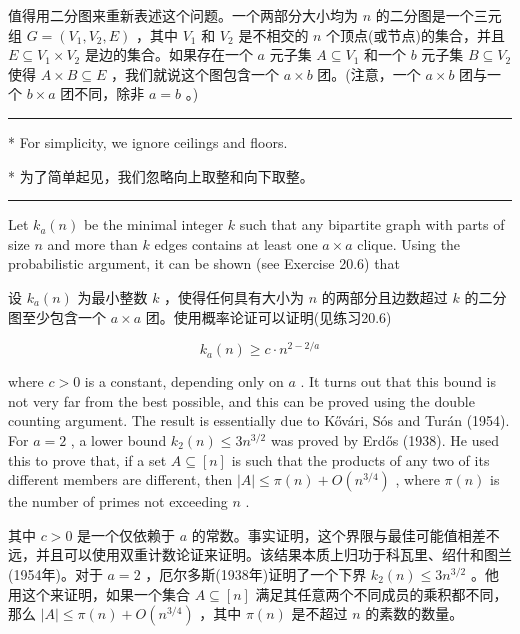 \documentclass[10pt]{article}
\newcommand{\HRule}{\begin{center}\rule{0.9\linewidth}{0.2mm}\end{center}}
\begin{document}
\begin{tcolorbox}\relax
值得用二分图来重新表述这个问题。一个两部分大小均为 \(n\) 的二分图是一个三元组 \(G = \left( {{V}_{1},{V}_{2},E}\right)\) ，其中 \({V}_{1}\) 和 \({V}_{2}\) 是不相交的 \(n\) 个顶点(或节点)的集合，并且 \(E \subseteq  {V}_{1} \times  {V}_{2}\) 是边的集合。如果存在一个 \(a\) 元子集 \(A \subseteq  {V}_{1}\) 和一个 \(b\) 元子集 \(B \subseteq  {V}_{2}\) 使得 \(A \times  B \subseteq  E\) ，我们就说这个图包含一个 \(a \times  b\) 团。(注意，一个 \(a \times  b\) 团与一个 \(b \times  a\) 团不同，除非 \(a = b\) 。)
\end{tcolorbox}

\HRule

* For simplicity, we ignore ceilings and floors.

\begin{tcolorbox}\relax
* 为了简单起见，我们忽略向上取整和向下取整。
\end{tcolorbox}

\HRule

Let \({k}_{a}\left( n\right)\) be the minimal integer \(k\) such that any bipartite graph with parts of size \(n\) and more than \(k\) edges contains at least one \(a \times  a\) clique. Using the probabilistic argument, it can be shown (see Exercise 20.6) that

\begin{tcolorbox}\relax
设 \({k}_{a}\left( n\right)\) 为最小整数 \(k\) ，使得任何具有大小为 \(n\) 的两部分且边数超过 \(k\) 的二分图至少包含一个 \(a \times  a\) 团。使用概率论证可以证明(见练习20.6)
\end{tcolorbox}

\[
{k}_{a}\left( n\right)  \geq  c \cdot  {n}^{2 - 2/a}
\]

where \(c > 0\) is a constant, depending only on \(a\) . It turns out that this bound is not very far from the best possible, and this can be proved using the double counting argument. The result is essentially due to Kővári, Sós and Turán (1954). For \(a = 2\) , a lower bound \({k}_{2}\left( n\right)  \leq  3{n}^{3/2}\) was proved by Erdős (1938). He used this to prove that, if a set \(A \subseteq  \left\lbrack  n\right\rbrack\) is such that the products of any two of its different members are different, then \(\left| A\right|  \leq  \pi \left( n\right)  + O\left( {n}^{3/4}\right)\) , where \(\pi \left( n\right)\) is the number of primes not exceeding \(n\) .

\begin{tcolorbox}\relax
其中 \(c > 0\) 是一个仅依赖于 \(a\) 的常数。事实证明，这个界限与最佳可能值相差不远，并且可以使用双重计数论证来证明。该结果本质上归功于科瓦里、绍什和图兰(1954年)。对于 \(a = 2\) ，厄尔多斯(1938年)证明了一个下界 \({k}_{2}\left( n\right)  \leq  3{n}^{3/2}\) 。他用这个来证明，如果一个集合 \(A \subseteq  \left\lbrack  n\right\rbrack\) 满足其任意两个不同成员的乘积都不同，那么 \(\left| A\right|  \leq  \pi \left( n\right)  + O\left( {n}^{3/4}\right)\) ，其中 \(\pi \left( n\right)\) 是不超过 \(n\) 的素数的数量。
\end{tcolorbox}
\end{document}
